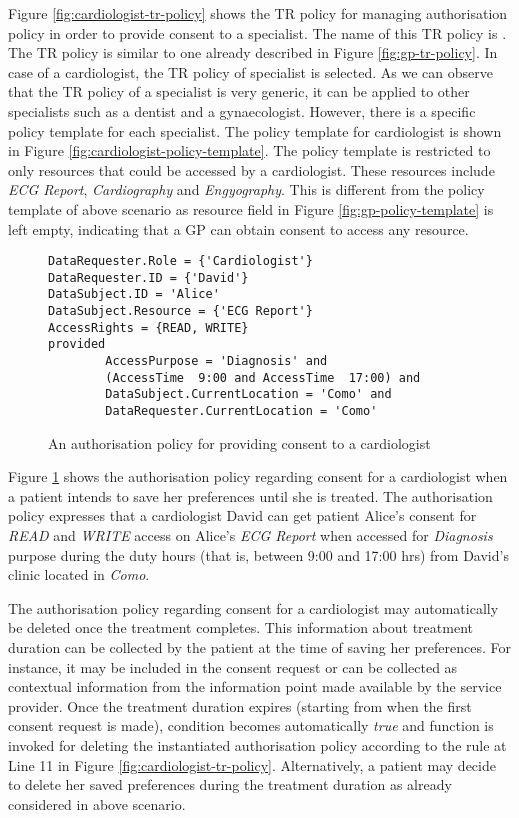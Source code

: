 \documentclass[10pt, conference, compsocconf]{IEEEtran}
\newcommand{\Keywords}{\lstset{keywords={provided,is,within,and,or,(,),TRUE,FALSE,tr-policy}}}
\begin{document}
Figure \ref{fig:cardiologist-tr-policy} shows the TR policy for managing authorisation policy in order to provide consent to a specialist. The name of this TR policy is . The TR policy is similar to one already described in Figure \ref{fig:gp-tr-policy}. In case of a cardiologist, the TR policy of specialist is selected. As we can observe that the TR policy of a specialist is very generic, it can be applied to other specialists such as a dentist and a gynaecologist. However, there is a specific policy template for each specialist. The policy template for cardiologist is shown in Figure \ref{fig:cardiologist-policy-template}. The policy template is restricted to only resources that could be accessed by a cardiologist. These resources include \emph{ECG Report}, \emph{Cardiography} and \emph{Engyography}. This is different from the policy template of above scenario as resource field in Figure \ref{fig:gp-policy-template} is left empty, indicating that a GP can obtain consent to access any resource.


\begin{figure} [htp]
\Keywords
\begin{lstlisting}[style=AMMA,breaklines,mathescape,rulesepcolor=\color{black}]
DataRequester.Role = {'Cardiologist'}
DataRequester.ID = {'David'}
DataSubject.ID = 'Alice'
DataSubject.Resource = {'ECG Report'}
AccessRights = {READ, WRITE}
provided
		AccessPurpose = 'Diagnosis' and
		(AccessTime  9:00 and AccessTime  17:00) and
		DataSubject.CurrentLocation = 'Como' and
		DataRequester.CurrentLocation = 'Como'
\end{lstlisting}
\caption{An authorisation policy for providing consent to a cardiologist}
\label{fig:cardiologist-authorisation-policy}
\end{figure}


Figure \ref{fig:cardiologist-authorisation-policy} shows the authorisation policy regarding consent for a cardiologist when a patient intends to save her preferences until she is treated. The authorisation policy expresses that a cardiologist David can get patient Alice's consent for \emph{READ} and \emph{WRITE} access on Alice's \emph{ECG Report} when accessed for \emph{Diagnosis} purpose during the duty hours (that is, between 9:00 and 17:00 hrs) from David's clinic located in \emph{Como}.

The authorisation policy regarding consent for a cardiologist may automatically be deleted once the treatment completes. This information about treatment duration can be collected by the patient at the time of saving her preferences. For instance, it may be included in the consent request or can be collected as contextual information from the information point made available by the service provider. Once the treatment duration expires (starting from when the first consent request is made), condition  becomes automatically \emph{true} and  function is invoked for deleting the instantiated authorisation policy according to the rule at Line 11 in Figure \ref{fig:cardiologist-tr-policy}. Alternatively, a patient may decide to delete her saved preferences during the treatment duration as already considered in above scenario.
\end{document}
